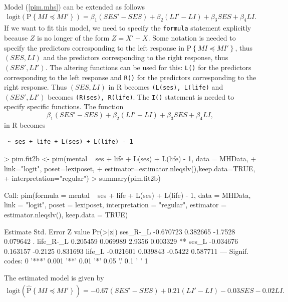 \documentclass[12pt]{article}
\newcommand{\prob}[1]{\text{P}\left\{#1\right\}}
\newcommand{\hatprob}[1]{\hat{\text{P}}\left\{#1\right\}}
\newcommand{\leqs}{\preccurlyeq}
\begin{document}
Model (\ref{pim.mhs}) can be extended as follows
\begin{eqnarray*}
\text{logit}\left(\prob{MI \leqs MI'} \right) = \beta_1 (SES' - SES) + \beta_2 (LI' - LI) + \beta_3 SES + \beta_4 LI. 
\end{eqnarray*}
If we want to fit this model, we need to specify the \texttt{formula} statement explicitly because $Z$ is no longer of the form $Z = X' - X$. Some notation is needed to specify the predictors corresponding to the left response in $\prob{MI \leqs MI'}$, thus $(SES,LI)$ and the predictors corresponding to the right response, thus $(SES', LI')$. The altering functions can be used for this: \texttt{L()} for the predictors corresponding to the left response and \texttt{R()} for the predictors corresponding to the right response. Thus $(SES, LI)$ in R becomes \texttt{(L(ses), L(life)} and $(SES',LI')$ becomes \texttt{(R(ses), R(life)}. The \texttt{I()} statement is needed to specify specific functions. The function
\[
\beta_1 (SES' - SES) + \beta_2 (LI' - LI) + \beta_3 SES + \beta_4 LI,
\]
in R becomes
\begin{center}
\begin{verbatim}
 ~ ses + life + L(ses) + L(life) - 1
\end{verbatim}
\end{center}
\begin{Schunk}
\begin{Sinput}
> pim.fit2b <- pim(mental ~ ses + life + L(ses) + L(life) - 1, data = MHData,  
+   link="logit", poset=lexiposet,  
+   estimator=estimator.nleqslv(),keep.data=TRUE, 
+   interpretation="regular")
> summary(pim.fit2b)
\end{Sinput}
\begin{Soutput}
Call:
pim(formula = mental ~ ses + life + L(ses) + L(life) - 1, data = MHData, 
    link = "logit", poset = lexiposet, interpretation = "regular", 
    estimator = estimator.nleqslv(), keep.data = TRUE)

           Estimate Std. Error Z value Pr(>|z|)   
ses_R-_L  -0.670723   0.382665 -1.7528 0.079642 . 
life_R-_L  0.205459   0.069989  2.9356 0.003329 **
ses_L     -0.034676   0.163157 -0.2125 0.831693   
life_L    -0.021601   0.039843 -0.5422 0.587711   
---
Signif. codes:  0 '***' 0.001 '**' 0.01 '*' 0.05 '.' 0.1 ' ' 1 
\end{Soutput}
\end{Schunk}
The estimated model is given by
\begin{eqnarray*}
\text{logit}\left(\hatprob{MI \leqs MI'} \right) = -0.67 (SES' - SES) + 0.21 (LI' - LI)  -0.03 SES  -0.02 LI. 
\end{eqnarray*}
\end{document}
